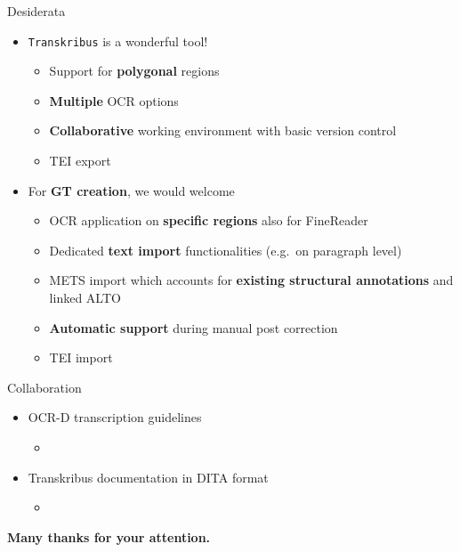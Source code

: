 \documentclass{bbawslides}
\begin{document}
\begin{bbawslide}{Desiderata}
  \vspace*{7mm}%
  \centerslidestrue%
  \begin{itemize}
    \item \texttt{Transkribus} is a wonderful tool!
    \begin{itemize}\small
      \item Support for \textbf{polygonal} regions
      \item \textbf{Multiple} OCR options
      \item \textbf{Collaborative} working environment with basic version control
      \item TEI export
    \end{itemize}
    \item For \textbf{GT creation}, we would welcome
    \begin{itemize}\small
      \item OCR application on \textbf{specific regions} also for FineReader
      \item Dedicated \textbf{text import} functionalities (e.g.~on paragraph level)
      \item METS import which accounts for \textbf{existing structural annotations} and linked ALTO
      \item \textbf{Automatic support} during manual post correction
      \item TEI import
    \end{itemize}
  \end{itemize}
\end{bbawslide}

\begin{bbawslide}{Collaboration}
  \vspace*{7mm}%
  \centerslidestrue%
  \begin{itemize}
    \item OCR-D transcription guidelines
    \begin{itemize}
      \item
    \end{itemize}
    \item Transkribus documentation in DITA format
    \begin{itemize}
      \item
    \end{itemize}
  \end{itemize}
\end{bbawslide}

\begin{bbawpart}{\Large\bf Many thanks for your attention.}
\end{bbawpart}
\end{document}
